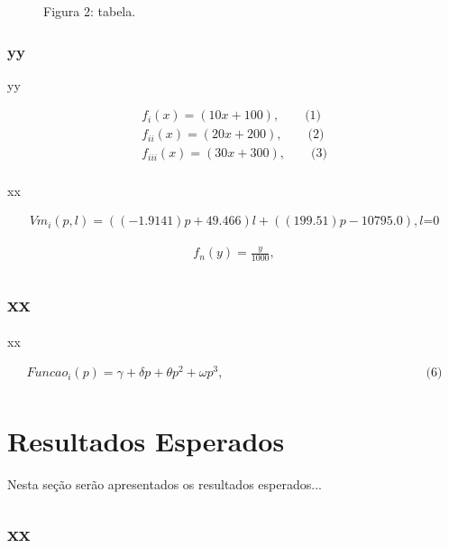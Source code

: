 \documentclass[12pt]{article}
\begin{document}
\begin{figure}[H]
\centering
\begin{center}
Figura 2: tabela.
\end{center}
\end{figure}

\newpage
\subsubsection{yy}

yy

\begin{align*}
f_{i}(x) = (10x + 100), \qquad \text{(1)} \tag{1}\\
f_{ii}(x) = (20x + 200), \qquad \text{(2)} \tag{2} \\
f_{iii}(x) = (30x + 300), \qquad \text{(3)} \tag{3} \\
\end{align*} %

xx

\begin{align*}
Vm_{i}(p,l) = ((-1.9141)p + 49.466)l + ((199.51)p - 10795.0), \text {$l$=0} \tag{4}
\end{align*}

\begin{align*}
f_{n}(y) = \frac{y}{1000}, \tag{5}
\end{align*}

\subsection{xx}

xx

\begin{align*} 
Funcao_{i}(p) = \gamma + \delta p + \theta p^2 + \omega p^3, \qquad \qquad \qquad \qquad \qquad \qquad \qquad \qquad \text{(6)} \tag{6} \\
\end{align*} %

\newpage
\section{Resultados Esperados}

Nesta seção serão apresentados os resultados esperados...

\subsection{xx}
\end{document}
